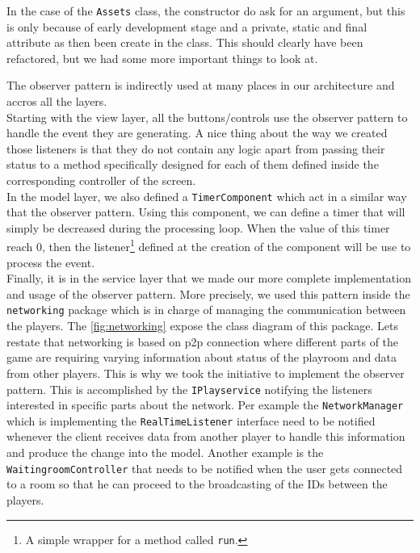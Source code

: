 In the case of the \texttt{Assets} class, the constructor do ask for an argument, but this is only because of early development stage and a private, static and final attribute as then been create in the class. This should clearly have been refactored, but we had some more important things to look at.


The observer pattern is indirectly used at many places in our architecture and accros all the layers. \\

Starting with the view layer, all the buttons/controls use the observer pattern to handle the event they are generating. A nice thing about the way we created those listeners is that they do not contain any logic apart from passing their status to a method specifically designed for each of them defined inside the corresponding controller of the screen. \\

In the model layer, we also defined a \texttt{TimerComponent} which act in a similar way that the observer pattern. Using this component, we can define a timer that will simply be decreased during the processing loop. When the value of this timer reach 0, then the listener\footnote{A simple wrapper for a method called \texttt{run}.} defined at the creation of the component will be use to process the event. \\

Finally, it is in the service layer that we made our more complete implementation and usage of the observer pattern. More precisely, we used this pattern inside the \texttt{networking} package which is in charge of managing the communication between the players. The \autoref{fig:networking} expose the class diagram of this package. Lets restate that networking is based on \gls{p2p} connection where different parts of the game are requiring varying information about status of the playroom and data from other players. This is why we took the initiative to implement the observer pattern. This is accomplished by the \texttt{IPlayservice} notifying the listeners interested in specific parts about the network. Per example the \texttt{NetworkManager} which is implementing the \texttt{RealTimeListener} interface need to be notified whenever the client receives data from another player to handle this information and produce the change into the model. Another example is the \texttt{WaitingroomController} that needs to be notified when the user gets connected to a room so that he can proceed to the broadcasting of the IDs between the players.

